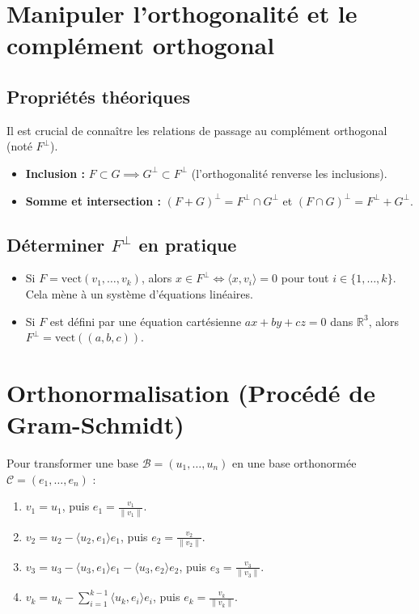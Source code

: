 \documentclass[french]{yLectureNote}
\begin{document}
\section{Manipuler l'orthogonalité et le complément orthogonal}
\subsection{Propriétés théoriques}
Il est crucial de connaître les relations de passage au complément orthogonal (noté $F^\perp$).
\begin{itemize}
    \item \textbf{Inclusion :} $F \subset G \implies G^\perp \subset F^\perp$ (l'orthogonalité renverse les inclusions).
    \item \textbf{Somme et intersection :} $(F+G)^\perp = F^\perp \cap G^\perp$ et $(F \cap G)^\perp = F^\perp + G^\perp$.
\end{itemize}

\subsection{Déterminer $F^\perp$ en pratique}
\begin{itemize}
    \item Si $F = \text{vect}(v_1, \dots, v_k)$, alors $x \in F^\perp \iff \langle x, v_i \rangle = 0$ pour tout $i \in \{1, \dots, k\}$. Cela mène à un système d'équations linéaires.
    \item Si $F$ est défini par une équation cartésienne $ax+by+cz=0$ dans $\mathbb{R}^3$, alors $F^\perp = \text{vect}((a, b, c))$.
\end{itemize}

\section{Orthonormalisation (Procédé de Gram-Schmidt)}
Pour transformer une base $\mathcal{B} = (u_1, \dots, u_n)$ en une base orthonormée $\mathcal{C} = (e_1, \dots, e_n)$ :
\begin{enumerate}
    \item $v_1 = u_1$, puis $e_1 = \frac{v_1}{\|v_1\|}$.
    \item $v_2 = u_2 - \langle u_2, e_1 \rangle e_1$, puis $e_2 = \frac{v_2}{\|v_2\|}$.
    \item $v_3 = u_3 - \langle u_3, e_1 \rangle e_1 - \langle u_3, e_2 \rangle e_2$, puis $e_3 = \frac{v_3}{\|v_3\|}$.
    \item $v_k = u_k - \sum_{i=1}^{k-1} \langle u_k, e_i \rangle e_i$, puis $e_k = \frac{v_k}{\|v_k\|}$.
\end{enumerate}
\end{document}
